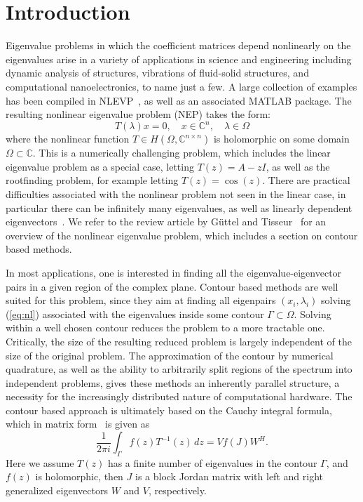 \documentclass[onefignum,onetabnum]{siamart190516}
\begin{document}
\section{Introduction}
Eigenvalue problems in which the coefficient matrices depend nonlinearly on the eigenvalues arise in a variety of applications in science and engineering including dynamic analysis of structures, vibrations of fluid-solid structures, and computational nanoelectronics, to name just a few. 
A large collection of examples has been compiled in NLEVP~\cite{betcke2013}, as well as an associated MATLAB package. 
The resulting nonlinear eigenvalue problem (NEP) takes the form:
\begin{equation}
	T(\lambda) x = 0, \quad
	x \in \mathbb{C}^n, \quad
	\lambda \in \Omega
        \label{eq:nl}
\end{equation}
where the nonlinear function \( T \in H(\Omega, \mathbb{C}^{n\times n}) \) is holomorphic on some domain \( \Omega \subset \mathbb{C} \).
This is a numerically challenging problem, which includes the linear eigenvalue problem as a special case, letting \( T(z) = A - z I \), as well as the rootfinding problem, for example letting \( T(z) = \cos(z) \).
There are practical difficulties associated with the nonlinear problem not seen in the linear case, in particular there can be infinitely many eigenvalues, as well as linearly dependent eigenvectors~\cite{voss2014}.
We refer to the review article by G\"uttel and Tisseur~\cite{guttel2017} for an overview of the nonlinear eigenvalue problem, which includes a section on contour based methods.

In most applications, one is interested in finding all the eigenvalue-eigenvector pairs in a given region of the complex plane.
Contour based methods are well suited for this problem, since they aim at finding all eigenpairs \( (x_i, \lambda_i) \) solving (\ref{eq:nl}) associated with the eigenvalues inside some contour \( \Gamma \subset \Omega \). Solving within a well chosen contour reduces the problem to a more tractable one. 
Critically, the size of the resulting reduced problem is largely independent of the size of the original problem.
The approximation of the contour by numerical quadrature, as well as the ability to arbitrarily split regions of the spectrum into independent problems, gives these methods an inherently parallel structure, a necessity for the increasingly distributed nature of computational hardware.
The contour based approach is ultimately based on the Cauchy integral formula, which in matrix form~\cite{higham2008} is given as
\begin{equation}\label{eq:cauchy}
	\frac{1}{2\pi i} \int_{\Gamma} f(z)T^{-1}(z) \, dz = V f(J) W^H.
\end{equation}
Here we assume \( T(z) \) has a finite number of  eigenvalues in the contour \(\Gamma\), and \(f(z)\) is holomorphic, then \( J \) is a block Jordan matrix with left and right generalized eigenvectors \( W \) and \( V \), respectively.
\end{document}
